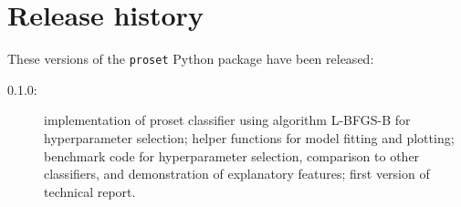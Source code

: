 \section{Release history}
\label{sec_release_history}
%
These versions of the \texttt{proset} Python package have been released:
%
\begin{description}
\item[0.1.0:] implementation of proset classifier using algorithm L-BFGS-B \cite{Byrd_95} for hyperparameter selection;
helper functions for model fitting and plotting;
benchmark code for hyperparameter selection, comparison to other classifiers, and demonstration of explanatory features;
first version of technical report.
\end{description}
%
\endinput
